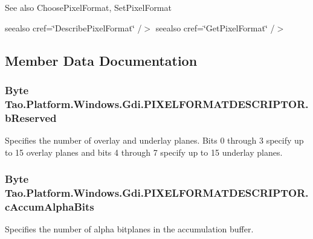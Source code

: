 \begin{DoxySeeAlso}{See also}
ChoosePixelFormat, SetPixelFormat


\end{DoxySeeAlso}
seealso cref=\char`\"{}DescribePixelFormat\char`\"{} /$>$ seealso cref=\char`\"{}GetPixelFormat\char`\"{} /$>$  

\subsection{Member Data Documentation}
\hypertarget{struct_tao_1_1_platform_1_1_windows_1_1_gdi_1_1_p_i_x_e_l_f_o_r_m_a_t_d_e_s_c_r_i_p_t_o_r_a17cebccecdb56ef2f219f9b46e888a57}{
\subsubsection[{bReserved}]{\setlength{\rightskip}{0pt plus 5cm}Byte {\bf Tao.Platform.Windows.Gdi.PIXELFORMATDESCRIPTOR.bReserved}}}
\label{struct_tao_1_1_platform_1_1_windows_1_1_gdi_1_1_p_i_x_e_l_f_o_r_m_a_t_d_e_s_c_r_i_p_t_o_r_a17cebccecdb56ef2f219f9b46e888a57}


Specifies the number of overlay and underlay planes. Bits 0 through 3 specify up to 15 overlay planes and bits 4 through 7 specify up to 15 underlay planes. 

\hypertarget{struct_tao_1_1_platform_1_1_windows_1_1_gdi_1_1_p_i_x_e_l_f_o_r_m_a_t_d_e_s_c_r_i_p_t_o_r_a9ac96be0a40a98bce22582529cb8d45a}{
\subsubsection[{cAccumAlphaBits}]{\setlength{\rightskip}{0pt plus 5cm}Byte {\bf Tao.Platform.Windows.Gdi.PIXELFORMATDESCRIPTOR.cAccumAlphaBits}}}
\label{struct_tao_1_1_platform_1_1_windows_1_1_gdi_1_1_p_i_x_e_l_f_o_r_m_a_t_d_e_s_c_r_i_p_t_o_r_a9ac96be0a40a98bce22582529cb8d45a}


Specifies the number of alpha bitplanes in the accumulation buffer. 

